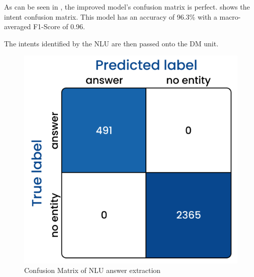 \documentclass[hidelinks, 11pt]{article}
\begin{document}
As can be seen in , the improved model's confusion matrix is perfect.  shows the intent confusion matrix. This model has an accuracy of 96.3\% with a macro-averaged F1-Score of 0.96.

The intents identified by the NLU are then passed onto the DM unit.

\begin{figure}[h!]
  \includegraphics[width=\columnwidth]{images/answer_confusion_matrix.jpg}
  \caption{Confusion Matrix of NLU answer extraction}
  \label{fig:cm_answer_extraction}
\end{figure}
\end{document}
